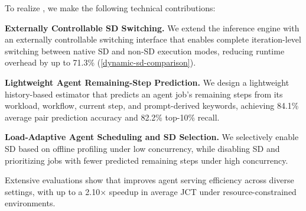 To realize \sysname, we make the following technical contributions:
    
\noindent\textbf{Externally Controllable SD Switching.}
    We extend the inference engine with an externally controllable switching interface that enables complete iteration-level switching between native SD and non-SD execution modes, reducing runtime overhead by up to 71.3\% (\autoref{dynamic-sd-comparison}).
    
\noindent\textbf{Lightweight Agent Remaining-Step Prediction.}
    We design a lightweight history-based estimator that predicts an agent job's remaining steps from its workload, workflow, current step, and prompt-derived keywords, achieving 84.1\% average pair prediction accuracy and 82.2\% top-10\% recall.
    
\noindent\textbf{Load-Adaptive Agent Scheduling and SD Selection.}
    We selectively enable SD based on offline profiling under low concurrency, while disabling SD and prioritizing jobs with fewer predicted remaining steps under high concurrency.



Extensive evaluations show that \sysname improves agent serving efficiency across diverse settings, with up to a 2.10$\times$ speedup in average JCT under resource-constrained environments.